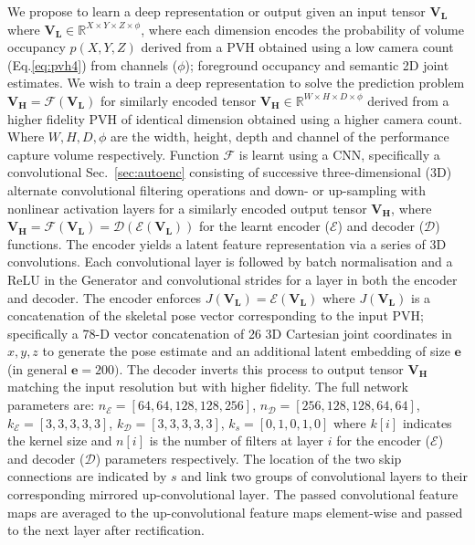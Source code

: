 \documentclass{bmvc2k}
\begin{document}
We propose to learn a deep representation or output given an input tensor $\mathbf{V_L}$ where $\mathbf{V_L} \in \mathbb{R}^{X \times Y \times Z \times \phi}$, where each dimension encodes the probability of volume occupancy $p(X,Y,Z)$ derived from a PVH obtained using a low camera count (Eq.\ref{eq:pvh4}) from channels ($\phi$); foreground occupancy  and semantic 2D  joint  estimates.  We wish to train a deep representation to solve the prediction problem $\mathbf{V_H} = \mathcal{F}(\mathbf{V_L})$ for similarly encoded tensor $\mathbf{V_H} \in \mathbb{R}^{W \times H \times D \times \phi}$ derived from a higher fidelity PVH of identical dimension obtained using a  higher camera count. Where $W,H,D,\phi$ are the width, height, depth and channel of the performance capture volume respectively.  Function $\mathcal{F}$ is learnt using a CNN, specifically a convolutional Sec.~\ref{sec:autoenc} consisting of successive three-dimensional (3D) alternate convolutional filtering operations and down- or up-sampling with nonlinear activation layers for a similarly encoded output tensor $\mathbf{V_H}$, where $\mathbf{V_H} = \mathcal{F}(\mathbf{V_L}) = \mathcal{D}(\mathcal{E}(\mathbf{V_L}))$
for the learnt encoder ($\mathcal{E}$) and decoder ($\mathcal{D}$) functions. The encoder yields a latent feature representation via a series of 3D convolutions. Each convolutional layer is followed by batch normalisation and a ReLU in the Generator and convolutional strides for a layer in both the encoder and decoder. The encoder enforces $J(\mathbf{V_L}) = \mathcal{E}(\mathbf{V_L})$ where $J(\mathbf{V_L})$ is a concatenation of the skeletal pose vector corresponding to the input PVH; specifically a 78-D vector concatenation of 26 3D Cartesian joint coordinates in ${x, y,z}$ to generate the pose estimate and an additional latent embedding of size $\mathbf{e}$ (in general $\mathbf{e}=200)$. The decoder  inverts this process to output tensor $\mathbf{V_H}$ matching the input resolution but with higher fidelity. 
The full network parameters are: $n_{\mathcal{E}} =[64,64,128,128,256]$, $n_{\mathcal{D}} = [256,128,128,64,64]$, $k_{\mathcal{E}} = [3,3,3,3,3]$, $k_{\mathcal{D}}= [3,3,3,3,3]$, $k_s = [0,1,0,1,0]$ 
where $k[i]$ indicates the kernel size and $n[i]$ is the number of filters at layer $i$ for the encoder ($\mathcal{E}$) and decoder ($\mathcal{D}$) parameters respectively. The location of the two skip connections are indicated by $s$ and link two groups of convolutional layers to their corresponding mirrored up-convolutional layer. The passed convolutional feature maps are averaged to the up-convolutional feature maps element-wise and passed to the next layer after rectification.  
\end{document}
